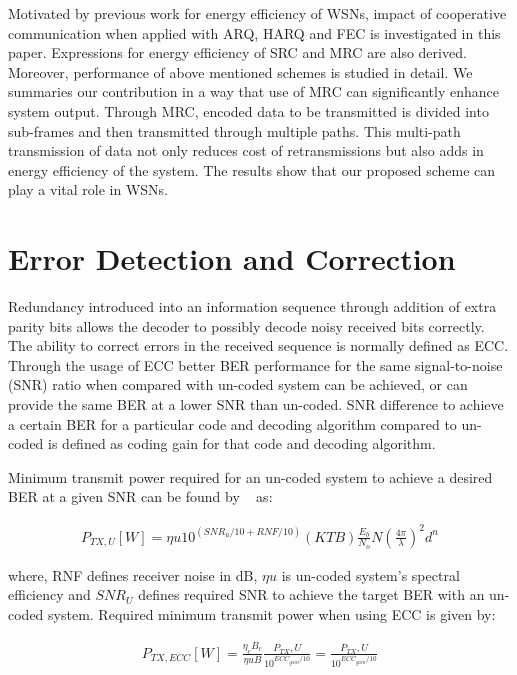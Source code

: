 \documentclass{sig-alternate}
\begin{document}
Motivated by previous work for energy efficiency of WSNs, impact of cooperative communication when applied with ARQ, HARQ and FEC is investigated in this paper. Expressions for energy efficiency of SRC and MRC are also derived. Moreover, performance of above mentioned schemes is studied in detail. We summaries our contribution in a way that use of MRC can significantly enhance system output. Through MRC, encoded data to be transmitted is divided into sub-frames and then transmitted through multiple paths. This multi-path transmission of data not only reduces cost of retransmissions but also adds in energy efficiency of the system. The results show that our proposed scheme can play a vital role in WSNs.

\section{Error Detection and Correction}

Redundancy introduced into an information sequence through addition of extra parity bits allows the decoder to possibly decode noisy received bits correctly. The ability to correct errors in the received sequence is normally defined as ECC. Through the usage of ECC better BER performance for the same signal-to-noise (SNR) ratio when compared with un-coded system can be achieved, or can provide the same BER at a lower SNR than un-coded. SNR difference to achieve a certain BER for a particular code and decoding algorithm compared to un-coded is defined as coding gain for that code and decoding algorithm.

Minimum transmit power required for an un-coded system to achieve a desired BER at a given SNR can be found by ~\cite{1} as:

\begin{eqnarray}\label{eq:1}
P_{TX,U}[W]=\eta u10^{(SNR_u/10+RNF/10)}(KTB)\frac{E_b}{N_o}N{(\frac{4\pi}{\lambda})}^2 d^n
\end{eqnarray}

where, RNF defines receiver noise in dB, $\eta u$ is un-coded system's spectral efficiency and $SNR_U$ defines required SNR to achieve the target BER with an un-coded system. Required minimum transmit power when using ECC is given by:

\begin{eqnarray}
P_{TX,ECC}[W]=\frac{\eta_c B_c}{\eta u B}\frac{P_{TX},U}{10^{ECC_{gain}/10}} = \frac{P_{TX},U}{10^{ECC_{gain}/10}}
\end{eqnarray}
\end{document}
